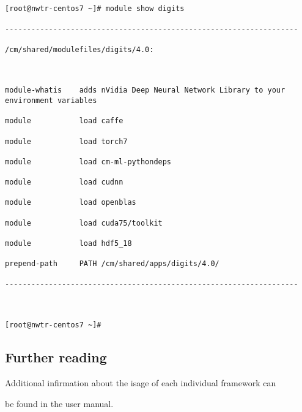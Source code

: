 \documentclass[]{article}
\begin{document}
\begin{verbatim}



[root@nwtr-centos7 ~]# module show digits

-------------------------------------------------------------------

/cm/shared/modulefiles/digits/4.0:



module-whatis    adds nVidia Deep Neural Network Library to your environment variables

module           load caffe

module           load torch7

module           load cm-ml-pythondeps

module           load cudnn

module           load openblas

module           load cuda75/toolkit

module           load hdf5_18

prepend-path     PATH /cm/shared/apps/digits/4.0/

-------------------------------------------------------------------



[root@nwtr-centos7 ~]#

\end{verbatim}



\subsection{Further reading}\label{further-reading}



Additional infirmation about the isage of each individual framework can

be found in the user manual.
\end{document}
